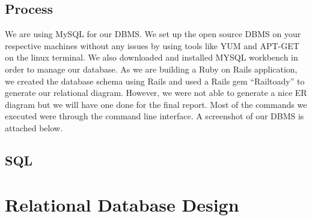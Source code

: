 \documentclass[12pt,letterpaper]{article}
\begin{document}
\subsection{Process}
We are using MySQL for our DBMS. We set up the open source DBMS on your respective machines without any issues by using tools like YUM and APT-GET on the linux terminal. We also downloaded and installed MYSQL workbench in order to manage our database. As we are building a Ruby on Rails application, we created the database schema using Rails and used a Rails gem “Railtoady” to generate our relational diagram. However, we were not able to generate a nice ER diagram but we will have one done for the final report. Most of the commands we executed were through the command line interface. A screenshot of our DBMS is attached below.

\subsection{SQL}

\clearpage\null

\section{Relational Database Design}
\end{document}
